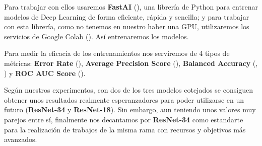 Para trabajar con ellos usaremos \textbf{FastAI} (\cite{fastai}), una librería de Python para entrenar modelos de Deep Learning de forma eficiente, rápida y sencilla; y para trabajar con esta librería, como no tenemos en nuestro haber una \ac{GPU}, utilizaremos los servicios de Google Colab (\cite{google-colab}). Así entrenaremos los modelos.

Para medir la eficacia de los entrenamientos nos serviremos de 4 tipos de métricas: \textbf{Error Rate} (\cite{error-rate}), \textbf{Average Precision Score} (\cite{apscore}), \textbf{Balanced Accuracy} (\cite{balanced-accuracy}, \cite{balanced-accuracy-2}) y \textbf{ROC AUC Score} (\cite{roc-auc-score}).

Según nuestros experimentos, con dos de los tres modelos cotejados se consiguen obtener unos resultados realmente esperanzadores para poder utilizarse en un futuro  (\textbf{ResNet-34} y \textbf{ResNet-18}). Sin embargo, aun teniendo unos valores muy parejos entre sí, finalmente nos decantamos por \textbf{ResNet-34} como estandarte para la realización de trabajos de la misma rama con recursos y objetivos más avanzados.

\begin{table}[H]
\centering
{}
\caption{Resultados de ResNet-34 y ResNet-18}
\label{tab:Resul_ResNet}
\end{table}

